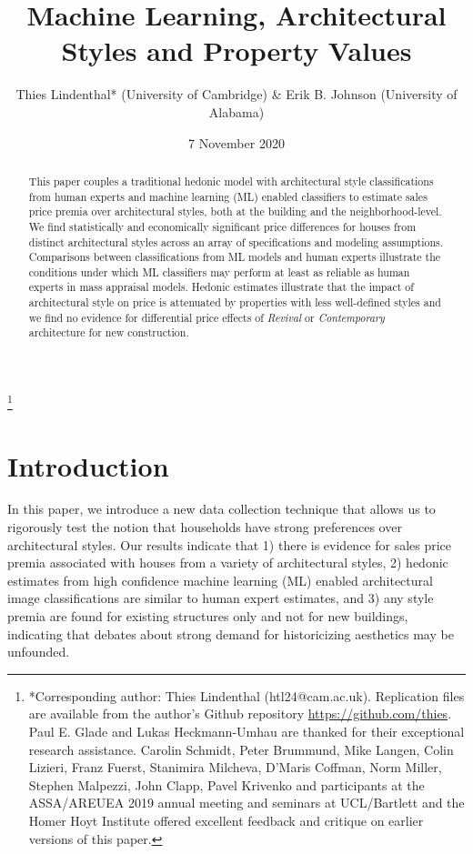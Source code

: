 \documentclass[]{article}
\begin{document}
\title{Machine Learning, Architectural Styles and Property Values}
\author{Thies Lindenthal* (University of Cambridge) \& Erik B. Johnson
(University of Alabama)}
\date{7 November 2020}

\maketitle
\begin{abstract}
This paper couples a traditional hedonic model with architectural style classifications from human experts and machine learning (ML) enabled classifiers to estimate sales price premia over architectural styles, both at the building and the neighborhood-level. We find statistically and economically significant price differences for houses from distinct architectural styles across an array of specifications and modeling assumptions. Comparisons between classifications from ML models and human experts illustrate the conditions under which ML classifiers may perform at least as reliable as human experts in mass appraisal models. Hedonic estimates illustrate that the impact of architectural style on price is attenuated by properties with less well-defined styles and we find no evidence for differential price effects of \emph{Revival} or \emph{Contemporary} architecture for new construction.
\end{abstract}

\let\svthefootnote\thefootnote
\let\thefootnote\relax

\footnote{{*Corresponding author: Thies Lindenthal (htl24@cam.ac.uk). Replication files are available from the author's Github repository \href{https://github.com/thies}{https://github.com/thies}. Paul E. Glade and Lukas Heckmann-Umhau are thanked for their exceptional research assistance. Carolin Schmidt, Peter Brummund, Mike Langen, Colin Lizieri, Franz Fuerst, Stanimira Milcheva, D'Maris Coffman, Norm Miller, Stephen Malpezzi, John Clapp, Pavel Krivenko and participants at the ASSA/AREUEA 2019 annual meeting and seminars at UCL/Bartlett and the Homer Hoyt Institute offered excellent feedback and critique on earlier versions of this paper.}}

\addtocounter{footnote}{-1}\let\thefootnote\svthefootnote

\newpage

\hypertarget{introduction}{%
\section{Introduction}\label{introduction}}
In this paper, we introduce a new data collection technique that allows us to rigorously test the notion that households have strong preferences over architectural styles. Our results indicate that 1) there is evidence for sales price premia associated with houses from a variety of architectural styles, 2) hedonic estimates from high confidence machine learning (ML) enabled architectural image classifications are similar to human expert estimates, and 3) any style premia are found for existing structures only and not for new buildings, indicating that debates about strong demand for historicizing aesthetics may be unfounded.  
\end{document}
